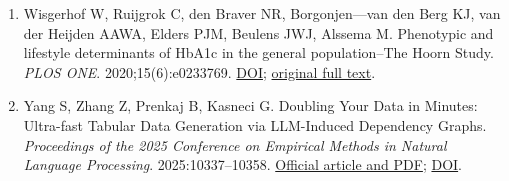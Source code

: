 \documentclass[10pt,twocolumn]{article}
\begin{document}
\begin{enumerate}
\item Wisgerhof W, Ruijgrok C, den Braver NR, Borgonjen—van den Berg KJ, van der Heijden AAWA, Elders PJM, Beulens JWJ, Alssema M. Phenotypic and lifestyle determinants of HbA1c in the general population–The Hoorn Study. \emph{PLOS ONE}. 2020;15(6):e0233769. \href{https://doi.org/10.1371/journal.pone.0233769}{DOI}; \href{https://pmc.ncbi.nlm.nih.gov/articles/PMC7272077/}{original full text}.

\item Yang S, Zhang Z, Prenkaj B, Kasneci G. Doubling Your Data in Minutes: Ultra-fast Tabular Data Generation via LLM-Induced Dependency Graphs. \emph{Proceedings of the 2025 Conference on Empirical Methods in Natural Language Processing}. 2025:10337–10358. \href{https://aclanthology.org/2025.emnlp-main.525/}{Official article and PDF}; \href{https://doi.org/10.18653/v1/2025.emnlp-main.525}{DOI}.

\end{enumerate}

\endgroup
\end{document}
